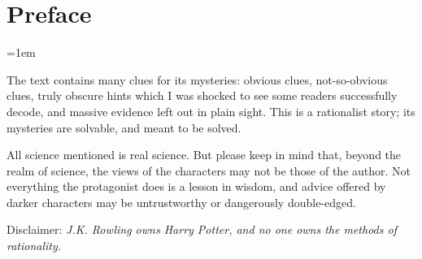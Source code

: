 \chapter*{Preface}
{
    \thispagestyle{empty}

    \parindent=0pt
    \parskip=1em

    The text contains many clues for its mysteries: obvious clues, not-so-obvious clues,
    truly obscure hints which I was shocked to see some readers successfully decode,
    and massive evidence left out in plain sight. This is a rationalist story;
    its mysteries are solvable, and meant to be solved.

    All science mentioned is real science. But please keep in mind that, beyond the
    realm of science, the views of the characters may not be those of the author.
    Not everything the protagonist does is a lesson in wisdom, and advice offered by
    darker characters may be untrustworthy or dangerously double-edged.

    \SomeVSpace
    Disclaimer: \emph{J.K. Rowling owns Harry Potter, and no one owns the methods of rationality.}
}

